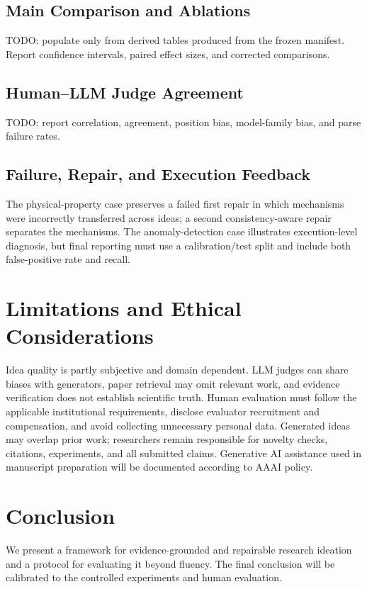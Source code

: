 \documentclass[letterpaper]{article}
\begin{document}
\subsection{Main Comparison and Ablations}
TODO: populate only from derived tables produced from the frozen manifest. Report confidence intervals, paired effect sizes, and corrected comparisons.

\subsection{Human--LLM Judge Agreement}
TODO: report correlation, agreement, position bias, model-family bias, and parse failure rates.

\subsection{Failure, Repair, and Execution Feedback}
The physical-property case preserves a failed first repair in which mechanisms were incorrectly transferred across ideas; a second consistency-aware repair separates the mechanisms. The anomaly-detection case illustrates execution-level diagnosis, but final reporting must use a calibration/test split and include both false-positive rate and recall.

\section{Limitations and Ethical Considerations}
Idea quality is partly subjective and domain dependent. LLM judges can share biases with generators, paper retrieval may omit relevant work, and evidence verification does not establish scientific truth. Human evaluation must follow the applicable institutional requirements, disclose evaluator recruitment and compensation, and avoid collecting unnecessary personal data. Generated ideas may overlap prior work; researchers remain responsible for novelty checks, citations, experiments, and all submitted claims. Generative AI assistance used in manuscript preparation will be documented according to AAAI policy.

\section{Conclusion}
We present a framework for evidence-grounded and repairable research ideation and a protocol for evaluating it beyond fluency. The final conclusion will be calibrated to the controlled experiments and human evaluation.



\end{document}
